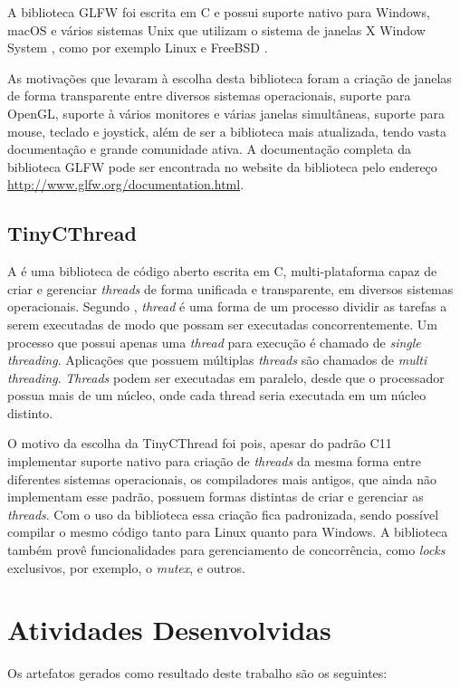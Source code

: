 \documentclass[12pt, %
openright,
oneside, %
a4paper,    %
brazil]{facom-ufu-abntex2}
\begin{document}
A biblioteca GLFW foi escrita em C e possui suporte nativo para Windows, macOS e vários sistemas Unix \cite{Unix:About} que utilizam o sistema de janelas X Window System \cite{X:About}, como por exemplo Linux \cite{Linux:About} e FreeBSD \cite{FreeBSD:About}.

As motivações que levaram à escolha desta biblioteca foram a criação de janelas de forma transparente entre diversos sistemas operacionais, suporte para OpenGL, suporte à vários monitores e várias janelas simultâneas, suporte para mouse, teclado e joystick, além de ser a biblioteca mais atualizada, tendo vasta documentação e grande comunidade ativa. A documentação completa da biblioteca GLFW pode ser encontrada no website da biblioteca pelo endereço \url{http://www.glfw.org/documentation.html}.

\subsection{TinyCThread}
A  é uma biblioteca de código aberto escrita em C, multi-plataforma capaz de criar e gerenciar \textit{threads} de forma unificada e transparente, em diversos sistemas operacionais. Segundo , \textit{thread} é uma forma de um processo dividir as tarefas a serem executadas de modo que possam ser executadas concorrentemente. Um processo que possui apenas uma \textit{thread} para execução é chamado de \textit{single threading}. Aplicações que possuem múltiplas \textit{threads} são chamados de \textit{multi threading}. \textit{Threads} podem ser executadas em paralelo, desde que o processador possua mais de um núcleo, onde cada thread seria executada em um núcleo distinto.

O motivo da escolha da TinyCThread foi pois, apesar do padrão C11 implementar suporte nativo para criação de \textit{threads} da mesma forma entre diferentes sistemas operacionais, os compiladores mais antigos, que ainda não implementam esse padrão, possuem formas distintas de criar e gerenciar as \textit{threads}. Com o uso da biblioteca essa criação fica padronizada, sendo possível compilar o mesmo código tanto para Linux quanto para Windows. A biblioteca também provê funcionalidades para gerenciamento de concorrência, como \textit{locks} exclusivos, por exemplo, o \textit{mutex}, e outros.

\section{Atividades Desenvolvidas}
Os artefatos gerados como resultado deste trabalho são os seguintes:
\end{document}

